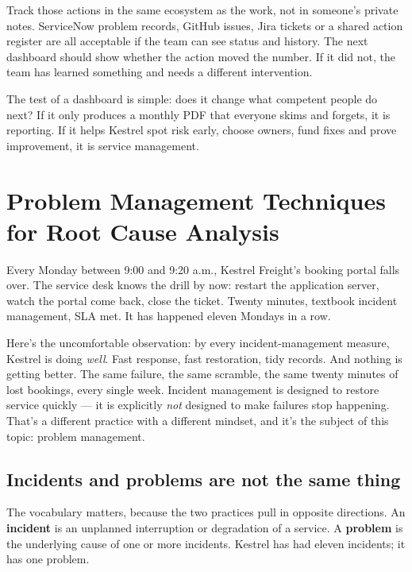 Track those actions in the same ecosystem as the work, not in someone's private notes. ServiceNow problem records, GitHub issues, Jira tickets or a shared action register are all acceptable if the team can see status and history. The next dashboard should show whether the action moved the number. If it did not, the team has learned something and needs a different intervention.


The test of a dashboard is simple: does it change what competent people do next? If it only produces a monthly PDF that everyone skims and forgets, it is reporting. If it helps Kestrel spot risk early, choose owners, fund fixes and prove improvement, it is service management.

\section{Problem Management Techniques for Root Cause Analysis}
Every Monday between 9:00 and 9:20 a.m., Kestrel Freight's booking portal falls over. The service desk knows the drill by now: restart the application server, watch the portal come back, close the ticket. Twenty minutes, textbook incident management, SLA met. It has happened eleven Mondays in a row.


Here's the uncomfortable observation: by every incident-management measure, Kestrel is doing \emph{well}. Fast response, fast restoration, tidy records. And nothing is getting better. The same failure, the same scramble, the same twenty minutes of lost bookings, every single week. Incident management is designed to restore service quickly — it is explicitly \emph{not} designed to make failures stop happening. That's a different practice with a different mindset, and it's the subject of this topic: problem management.



\subsection{Incidents and problems are not the same thing}


The vocabulary matters, because the two practices pull in opposite directions. An \textbf{incident} is an unplanned interruption or degradation of a service. A \textbf{problem} is the underlying cause of one or more incidents. Kestrel has had eleven incidents; it has one problem.


